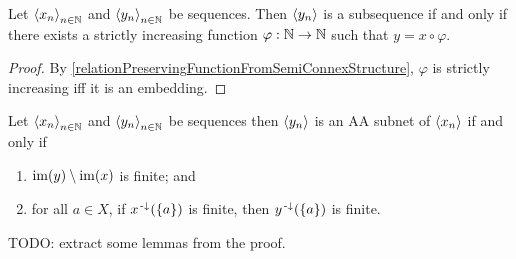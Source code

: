 \begin{lemma} \label{subsequenceLemma}
Let $\left\langle x_n \right\rangle_{n\in \mathbb{N}}$ and $\left\langle y_n \right\rangle_{n\in \mathbb{N}}$ be sequences. Then $\left\langle y_n \right\rangle$ is a subsequence \textup{if and only if} there exists a strictly increasing function $\varphi: \mathbb{N}\to \mathbb{N}$ such that $y = x\circ \varphi$.
\end{lemma}
\begin{proof}
By \ref{relationPreservingFunctionFromSemiConnexStructure}, $\varphi$ is strictly increasing iff it is an embedding.
\end{proof}

\begin{lemma} \label{sequenceAAsubnet}
Let $\left\langle x_n \right\rangle_{n\in \mathbb{N}}$ and $\left\langle y_n \right\rangle_{n\in \mathbb{N}}$ be sequences then $\left\langle y_n \right\rangle$ is an AA subnet of $\left\langle x_n \right\rangle$ \textup{if and only if}
\begin{enumerate}
\item $\operatorname{im}(y)\setminus \operatorname{im}(x)$ is finite; and
\item for all $a\in X$, if $x^{\text{\hspace{0.15em}-}\downarrow}(\{a\})$ is finite, then $y^{\text{\hspace{0.15em}-}\downarrow}(\{a\})$ is finite.
\end{enumerate}
\end{lemma}
TODO: extract some lemmas from the proof.
